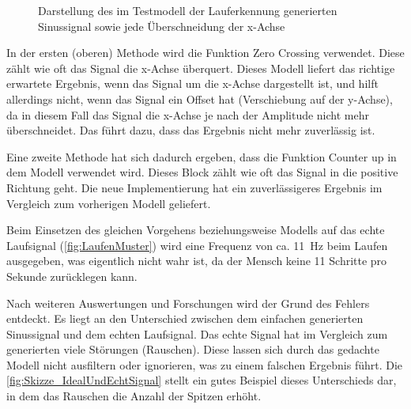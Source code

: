 \begin{figure}[htpb]
	\centering
	\caption{Darstellung des im Testmodell der Lauferkennung generierten Sinussignal sowie jede Überschneidung der x-Achse}
	\label{fig:Lauferkennung_Peaks_SinusSignal}
\end{figure}
In der ersten (oberen) Methode wird die Funktion \glqq Zero Crossing\grqq{} verwendet. Diese zählt wie oft das Signal die x-Achse überquert. Dieses Modell liefert das richtige erwartete Ergebnis, wenn das Signal um die x-Achse dargestellt ist, und hilft allerdings nicht, wenn das Signal ein Offset hat (Verschiebung auf der y-Achse), da in diesem Fall das Signal die x-Achse je nach der Amplitude nicht mehr überschneidet. Das führt dazu, dass das Ergebnis nicht mehr zuverlässig ist.

Eine zweite Methode hat sich dadurch ergeben, dass die Funktion \glqq Counter up\grqq{} in dem Modell verwendet wird. Dieses Block zählt wie oft das Signal in die positive Richtung geht. Die neue Implementierung hat ein zuverlässigeres Ergebnis im Vergleich zum vorherigen Modell geliefert.

Beim Einsetzen des gleichen Vorgehens beziehungsweise Modells auf das echte Laufsignal (\autoref{fig:LaufenMuster}) wird eine Frequenz von ca. \SI{11}{\hertz} beim Laufen ausgegeben, was eigentlich nicht wahr ist, da der Mensch keine 11 Schritte pro Sekunde zurücklegen kann.

Nach weiteren Auswertungen und Forschungen wird der Grund des Fehlers entdeckt. Es liegt an den Unterschied zwischen dem einfachen generierten Sinussignal und dem echten Laufsignal. Das echte Signal hat im Vergleich zum generierten viele Störungen (Rauschen). Diese lassen sich durch das gedachte Modell nicht ausfiltern oder ignorieren, was zu einem falschen Ergebnis führt. Die \autoref{fig:Skizze_IdealUndEchtSignal} stellt ein gutes Beispiel dieses Unterschieds dar, in dem das Rauschen die Anzahl der Spitzen erhöht.

